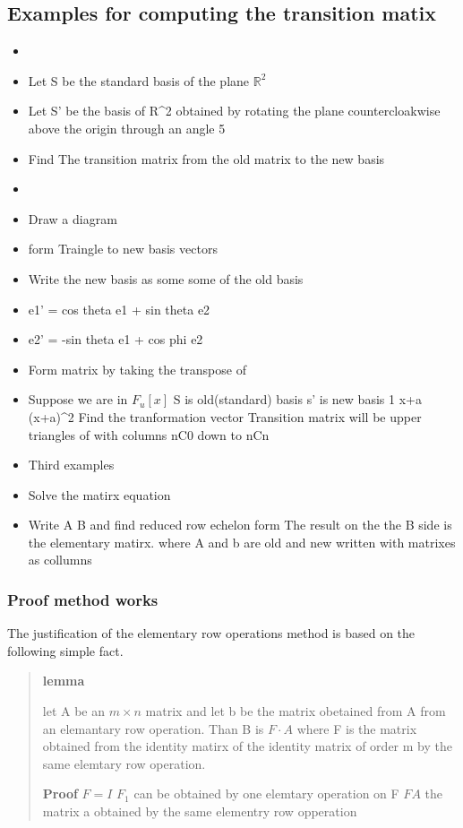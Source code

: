 \documentclass[twocolumn]{article}
\begin{document}
\hypertarget{examples-for-computing-the-transition-matix}{%
\subsection{Examples for computing the transition
matix}\label{examples-for-computing-the-transition-matix}}

\begin{itemize}
\item
\item
  Let S be the standard basis of the plane \(\mathbb{R}^2\)
\item
  Let S' be the basis of R\^{}2 obtained by rotating the plane
  countercloakwise above the origin through an angle 5
\item
  Find The transition matrix from the old matrix to the new basis
\item
\item
  Draw a diagram
\item
  form Traingle to new basis vectors
\item
  Write the new basis as some some of the old basis
\item
  e1' = cos theta e1 + sin theta e2
\item
  e2' = -sin theta e1 + cos phi e2
\item
  Form matrix by taking the transpose of
\item
  Suppose we are in \(F_u[x]\) S is old(standard) basis s' is new basis
  1 x+a (x+a)\^{}2 Find the tranformation vector Transition matrix will
  be upper triangles of with columns nC0 down to nCn
\item
  Third examples
\item
  Solve the matirx equation
\item
  Write A \textbar{} B and find reduced row echelon form The result on
  the the B side is the elementary matirx. where A and b are old and new
  written with matrixes as collumns
\end{itemize}

\hypertarget{proof-method-works}{%
\subsubsection{Proof method works}\label{proof-method-works}}

The justification of the elementary row operations method is based on
the following simple fact.

\begin{quote}
\textbf{lemma}

let A be an \(m \times n\) matrix and let b be the matrix obetained from
A from an elemantary row operation. Than B is \(F \cdot A\) where F is
the matrix obtained from the identity matirx of the identity matrix of
order m by the same elemtary row operation.

\textbf{Proof} \(F = I\) \(F_1\) can be obtained by one elemtary
operation on F \(F A\) the matrix a obtained by the same elementry row
opperation
\end{quote}
\end{document}
